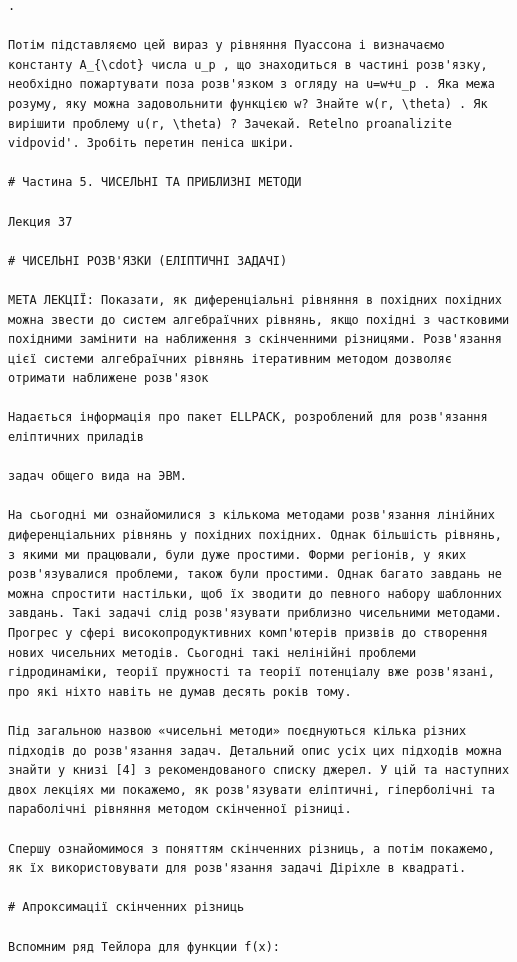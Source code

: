 \documentclass[
  ukrainian,
]{article}
\begin{document}
\begin{verbatim}
.

Потім підставляємо цей вираз у рівняння Пуассона і визначаємо константу A_{\cdot} числа u_p , що знаходиться в частині розв'язку, необхідно пожартувати поза розв'язком з огляду на u=w+u_p . Яка межа розуму, яку можна задовольнити функцією w? Знайте w(r, \theta) . Як вирішити проблему u(r, \theta) ? Зачекай. Retelno proanalizite vidpovid'. Зробіть перетин пеніса шкіри.

# Частина 5. ЧИСЕЛЬНІ ТА ПРИБЛИЗНІ МЕТОДИ

Лекция 37

# ЧИСЕЛЬНІ РОЗВ'ЯЗКИ (ЕЛІПТИЧНІ ЗАДАЧІ)

МЕТА ЛЕКЦІЇ: Показати, як диференціальні рівняння в похідних похідних можна звести до систем алгебраїчних рівнянь, якщо похідні з частковими похідними замінити на наближення з скінченними різницями. Розв'язання цієї системи алгебраїчних рівнянь ітеративним методом дозволяє отримати наближене розв'язок

Надається інформація про пакет ELLPACK, розроблений для розв'язання еліптичних приладів

задач общего вида на ЭВМ.

На сьогодні ми ознайомилися з кількома методами розв'язання лінійних диференціальних рівнянь у похідних похідних. Однак більшість рівнянь, з якими ми працювали, були дуже простими. Форми регіонів, у яких розв'язувалися проблеми, також були простими. Однак багато завдань не можна спростити настільки, щоб їх зводити до певного набору шаблонних завдань. Такі задачі слід розв'язувати приблизно чисельними методами. Прогрес у сфері високопродуктивних комп'ютерів призвів до створення нових чисельних методів. Сьогодні такі нелінійні проблеми гідродинаміки, теорії пружності та теорії потенціалу вже розв'язані, про які ніхто навіть не думав десять років тому.

Під загальною назвою «чисельні методи» поєднуються кілька різних підходів до розв'язання задач. Детальний опис усіх цих підходів можна знайти у книзі [4] з рекомендованого списку джерел. У цій та наступних двох лекціях ми покажемо, як розв'язувати еліптичні, гіперболічні та параболічні рівняння методом скінченної різниці.

Спершу ознайомимося з поняттям скінченних різниць, а потім покажемо, як їх використовувати для розв'язання задачі Діріхле в квадраті.

# Апроксимації скінченних різниць

Вспомним ряд Тейлора для функции f(x):
\end{verbatim}
\end{document}
